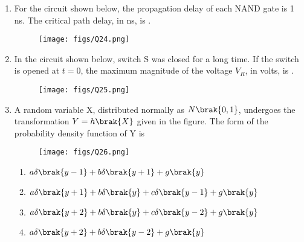 \documentclass[a4paper, 11pt]{article}
\begin{document}
\begin{enumerate}
    \hfill{}
    
    \item For the circuit shown below, the propagation delay of each NAND gate is 1 ns. The critical path delay, in ns, is \underline{\hspace{2cm}} .
    \begin{figure}[H]
        \centering
        \texttt{[image: figs/Q24.png]}
        \caption*{}
        \label{fig:q34}
    \end{figure}
    
    \hfill{}
    
    \item In the circuit shown below, switch S was closed for a long time. If the switch is opened at $t=0$, the maximum magnitude of the voltage $V_R$, in volts, is \underline{\hspace{2cm}} .
    \begin{figure}[H]
        \centering
        \texttt{[image: figs/Q25.png]}
        \caption*{}
        \label{fig:q35}
    \end{figure}
    
    \hfill{}
    
    \item A random variable X, distributed normally as $N\brak{0,1}$, undergoes the transformation $Y=h\brak{X}$ given in the figure. The form of the probability density function of Y is 
    \begin{figure}[H]
        \centering
        \texttt{[image: figs/Q26.png]}
        \caption*{}
        \label{fig:q36}
    \end{figure}
    
    \begin{enumerate}
        \item $a\delta\brak{y-1}+b\delta\brak{y+1}+g\brak{y}$
        \item $a\delta\brak{y+1}+b\delta\brak{y}+c\delta\brak{y-1}+g\brak{y}$
        \item $a\delta\brak{y+2}+b\delta\brak{y}+c\delta\brak{y-2}+g\brak{y}$
        \item $a\delta\brak{y+2}+b\delta\brak{y-2}+g\brak{y}$
    \end{enumerate}


\end{enumerate}
\end{document}
